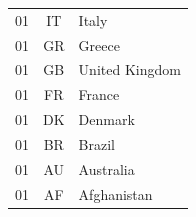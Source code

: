 \documentclass[
  printed, %
  table,   %
  lof,     %
  lot,     %
           oneside, color
]{fithesis3}
\begin{document}
\begin{figure}[H]
\begin{tabular}{ccl}
01                            & IT                         & Italy                 \\
01                            & GR                         & Greece                \\
01                            & GB                         & United Kingdom        \\
01                            & FR                         & France                \\
01                            & DK                         & Denmark               \\
01                            & BR                         & Brazil                \\
01                            & AU                         & Australia             \\
01                            & AF                         & Afghanistan           \\
\end{tabular}
\label{table:countriesminers}
\end{figure}


\label{monero-user-study-pdf}


\label{monero-miners-study-pdf}

%
%
\end{document}
